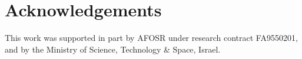 \section*{Acknowledgements} This work was supported in part by AFOSR under research contract FA9550201, and by the Ministry of Science, Technology \& Space, Israel.